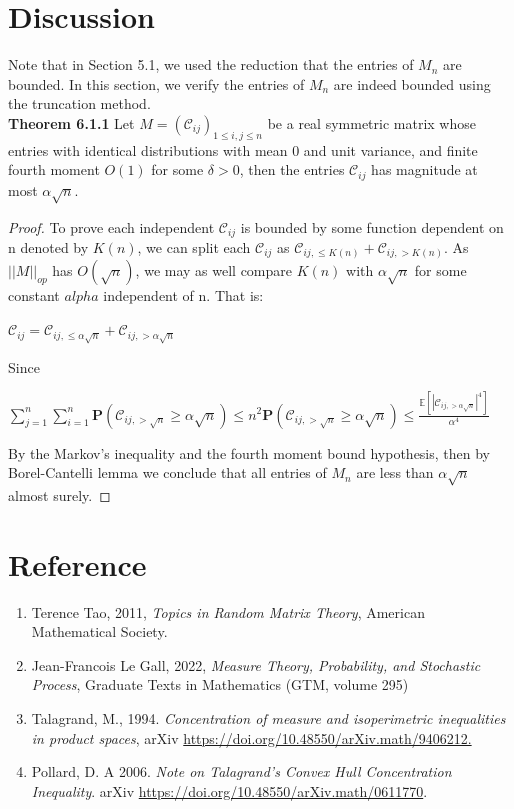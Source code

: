 \documentclass{article}
\begin{document}
\section{Discussion}
Note that in Section 5.1, we used the reduction that the entries of $M_n$ are bounded. In this section, we verify the entries of $M_n$ are indeed bounded using the truncation method.\\
\noindent\textbf{Theorem 6.1.1} Let $M = (\mathcal{C}_{ij})_{1\leq i,j \leq n}$ be a real symmetric matrix whose entries with identical distributions with mean 0 and unit variance, and finite fourth moment $O(1)$ for some $\delta > 0$, then the entries $\mathcal{C}_{ij}$ has magnitude at most $\alpha \sqrt{n}$.
\begin{proof}
    To prove each independent $\mathcal{C}_{ij}$ is bounded by some function dependent on n denoted by $K(n)$, we can split each $\mathcal{C}_{ij}$ as $\mathcal{C}_{ij, \leq K(n)} + \mathcal{C}_{ij, > K(n)}$. As $||M||_{op}$ has $O(\sqrt{n})$, we may as well compare $K(n)$ with $\alpha\sqrt{n}$ for some constant $alpha$ independent of n. That is:
    \begin{center}
        $\mathcal{C}_{ij} = \mathcal{C}_{ij, \leq \alpha\sqrt{n}} + \mathcal{C}_{ij, > \alpha\sqrt{n}}$
    \end{center}
    Since 
    \begin{center}
        $\sum\limits_{j=1}^n\sum\limits_{i=1}^n \mathbf{P}(\mathcal{C}_{ij, > \sqrt{n}} \geq \alpha \sqrt{n}) \leq n^2 \mathbf{P}(\mathcal{C}_{ij, > \sqrt{n}} \geq \alpha \sqrt{n}) \leq \frac{\mathbb{E}[|\mathcal{C}_{ij, > \alpha\sqrt{n}}|^4]}{\alpha^4}$
    \end{center}
    By the Markov's inequality and the fourth moment bound hypothesis, then by Borel-Cantelli lemma we conclude that all entries of $M_n$ are less than $\alpha\sqrt{n}$ almost surely.
\end{proof}
\section{Reference}
\begin{enumerate}

    \item Terence Tao, 2011, \textit{Topics in Random Matrix Theory}, American Mathematical Society.
    \item Jean-Francois Le Gall, 2022, \textit{Measure Theory, Probability, and Stochastic Process},  Graduate Texts in Mathematics (GTM, volume 295)
    \item Talagrand, M., 1994. \textit{Concentration of measure and isoperimetric inequalities in product spaces}, arXiv  \href{https://doi.org/10.48550/arXiv.math/9406212}{https://doi.org/10.48550/arXiv.math/9406212.}
    \item  Pollard, D. A 2006. \textit{Note on Talagrand’s Convex Hull Concentration Inequality}. arXiv \href{https://doi.org/10.48550/arXiv.math/0611770}{https://doi.org/10.48550/arXiv.math/0611770}.
\end{enumerate}
\end{document}
